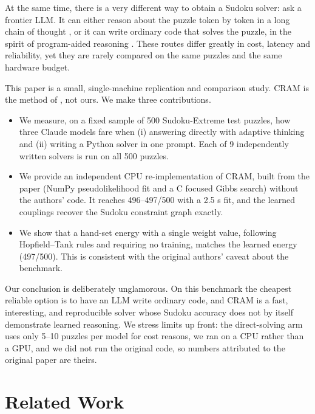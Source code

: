 \documentclass{article} %
\begin{document}
At the same time, there is a very different way to obtain a Sudoku solver: ask a frontier LLM. It can either reason about the puzzle token by token in a long chain of thought \citep{wei2022chain}, or it can write ordinary code that solves the puzzle, in the spirit of program-aided reasoning \citep{gao2023pal,chen2022program}. These routes differ greatly in cost, latency and reliability, yet they are rarely compared on the same puzzles and the same hardware budget.

This paper is a small, single-machine replication and comparison study. CRAM is the method of \citet{hoover2026cram}, not ours. We make three contributions.
\begin{itemize}
    \item We measure, on a fixed sample of 500 Sudoku-Extreme test puzzles, how three Claude models fare when (i) answering directly with adaptive thinking and (ii) writing a Python solver in one prompt. Each of 9 independently written solvers is run on all 500 puzzles.
    \item We provide an independent CPU re-implementation of CRAM, built from the paper (NumPy pseudolikelihood fit and a C focused Gibbs search) without the authors' code. It reaches 496--497/500 with a 2.5 s fit, and the learned couplings recover the Sudoku constraint graph exactly.
    \item We show that a hand-set energy with a single weight value, following Hopfield--Tank rules and requiring no training, matches the learned energy (497/500). This is consistent with the original authors' caveat about the benchmark.
\end{itemize}
Our conclusion is deliberately unglamorous. On this benchmark the cheapest reliable option is to have an LLM write ordinary code, and CRAM is a fast, interesting, and reproducible solver whose Sudoku accuracy does not by itself demonstrate learned reasoning. We stress limits up front: the direct-solving arm uses only 5--10 puzzles per model for cost reasons, we ran on a CPU rather than a GPU, and we did not run the original code, so numbers attributed to the original paper are theirs.

\section{Related Work}
\label{sec:related_work}
\end{document}
